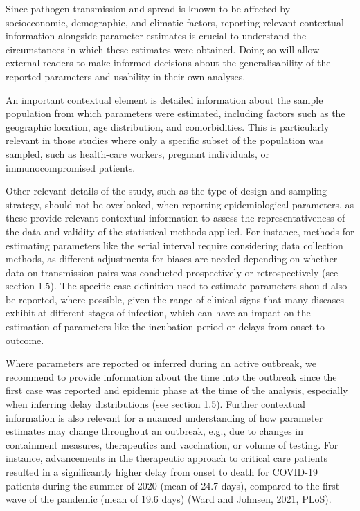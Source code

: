 \documentclass[
  10pt,
  letterpaper,
]{article}
\begin{document}
Since pathogen transmission and spread is known to be affected by
socioeconomic, demographic, and climatic factors, reporting relevant
contextual information alongside parameter estimates is crucial to
understand the circumstances in which these estimates were obtained.
Doing so will allow external readers to make informed decisions about
the generalisability of the reported parameters and usability in their
own analyses.

An important contextual element is detailed information about the sample
population from which parameters were estimated, including factors such
as the geographic location, age distribution, and comorbidities. This is
particularly relevant in those studies where only a specific subset of
the population was sampled, such as health-care workers, pregnant
individuals, or immunocompromised patients.

Other relevant details of the study, such as the type of design and
sampling strategy, should not be overlooked, when reporting
epidemiological parameters, as these provide relevant contextual
information to assess the representativeness of the data and validity of
the statistical methods applied. For instance, methods for estimating
parameters like the serial interval require considering data collection
methods, as different adjustments for biases are needed depending on
whether data on transmission pairs was conducted prospectively or
retrospectively (see section 1.5). The specific case definition used to
estimate parameters should also be reported, where possible, given the
range of clinical signs that many diseases exhibit at different stages
of infection, which can have an impact on the estimation of parameters
like the incubation period or delays from onset to outcome.

Where parameters are reported or inferred during an active outbreak, we
recommend to provide information about the time into the outbreak since
the first case was reported and epidemic phase at the time of the
analysis, especially when inferring delay distributions (see section
1.5). Further contextual information is also relevant for a nuanced
understanding of how parameter estimates may change throughout an
outbreak, e.g., due to changes in containment measures, therapeutics and
vaccination, or volume of testing. For instance, advancements in the
therapeutic approach to critical care patients resulted in a
significantly higher delay from onset to death for COVID-19 patients
during the summer of 2020 (mean of 24.7 days), compared to the first
wave of the pandemic (mean of 19.6 days) (Ward and Johnsen, 2021, PLoS).
\end{document}
